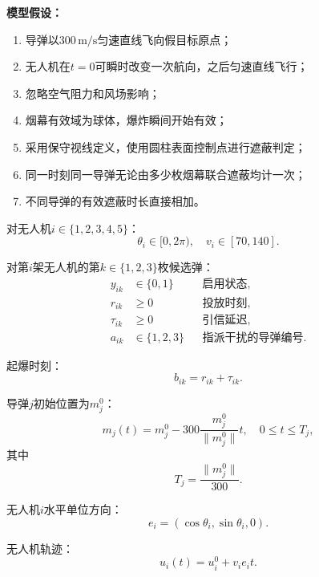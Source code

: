 \documentclass[12pt,a4paper]{article}
\begin{document}
	
	\textbf{模型假设：}
	\begin{enumerate}[label=(\arabic*)]
		\item 导弹以$300\,\text{m/s}$匀速直线飞向假目标原点；
		\item 无人机在$t=0$可瞬时改变一次航向，之后匀速直线飞行；
		\item 忽略空气阻力和风场影响；
		\item 烟幕有效域为球体，爆炸瞬间开始有效；
		\item 采用保守视线定义，使用圆柱表面控制点进行遮蔽判定；
		\item 同一时刻同一导弹无论由多少枚烟幕联合遮蔽均计一次；
		\item 不同导弹的有效遮蔽时长直接相加。
	\end{enumerate}
	
	
	
	
	对无人机$i\in\{1,2,3,4,5\}$：
	\begin{equation}
		\theta_i\in[0,2\pi),\quad v_i\in[70,140].
	\end{equation}
	
	
	
	对第$i$架无人机的第$k\in\{1,2,3\}$枚候选弹：
	\begin{align}
		y_{ik}&\in\{0,1\} &&\text{启用状态},\\
		r_{ik}&\geq0 &&\text{投放时刻},\\
		\tau_{ik}&\geq0 &&\text{引信延迟},\\
		a_{ik}&\in\{1,2,3\} &&\text{指派干扰的导弹编号}.
	\end{align}
	
	起爆时刻：
	\begin{equation}
		b_{ik}=r_{ik}+\tau_{ik}.
	\end{equation}
	
	
	
	
	
	导弹$j$初始位置为$m_j^0$：
	\begin{equation}
		m_j(t)=m_j^0-300\frac{m_j^0}{\|m_j^0\|}t,\quad 0\leq t\leq T_j,
	\end{equation}
	其中
	\begin{equation}
		T_j=\frac{\|m_j^0\|}{300}.
	\end{equation}
	
	
	无人机$i$水平单位方向：
	\begin{equation}
		e_i=(\cos\theta_i,\sin\theta_i,0).
	\end{equation}
	
	无人机轨迹：
	\begin{equation}
		u_i(t)=u_i^0+v_i e_i t.
	\end{equation}
	
\end{document}
